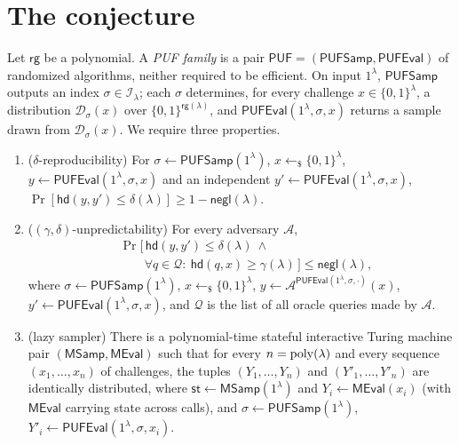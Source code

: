 \documentclass{aicr-conjecture}
\newcommand{\PUF}{\mathsf{PUF}}
\newcommand{\PUFSamp}{\mathsf{PUFSamp}}
\newcommand{\PUFEval}{\mathsf{PUFEval}}
\newcommand{\hdist}{\mathsf{hd}}
\newcommand{\negl}{\mathsf{negl}}
\newcommand{\rge}{\mathsf{rg}}
\newcommand{\tst}{\mathsf{st}}
\newcommand{\usample}{\leftarrow_{\$}}
\begin{document}
\section{The conjecture}\label{sec:conjectures}

\begin{definition}\label{def:puf}
Let $\rge$ be a polynomial. A \emph{PUF family} is a pair
$\PUF=(\PUFSamp,\PUFEval)$ of randomized algorithms, neither required
to be efficient. On input $1^\lambda$, $\PUFSamp$ outputs an index
$\sigma\in\mathcal{I}_\lambda$; each $\sigma$ determines, for every
challenge $x\in\{0,1\}^\lambda$, a distribution $\mathcal{D}_\sigma(x)$
over $\{0,1\}^{\rge(\lambda)}$, and $\PUFEval(1^\lambda,\sigma,x)$
returns a sample drawn from $\mathcal{D}_\sigma(x)$. We require three
properties.
\begin{enumerate}
\item ($\delta$-reproducibility) For
$\sigma\leftarrow\PUFSamp(1^\lambda)$, $x\usample\{0,1\}^\lambda$,
$y\leftarrow\PUFEval(1^\lambda,\sigma,x)$ and an independent
$y'\leftarrow\PUFEval(1^\lambda,\sigma,x)$,
$\Pr[\hdist(y,y')\le\delta(\lambda)]\ge 1-\negl(\lambda)$.
\item ($(\gamma,\delta)$-unpredictability) For every adversary
$\mathcal{A}$,
\[
\begin{aligned}
&\Pr\big[\,\hdist(y,y')\le\delta(\lambda)\ \wedge\\
&\qquad\forall q\in\mathcal{Q}:\ \hdist(q,x)\ge\gamma(\lambda)\,\big]
  \le\negl(\lambda),
\end{aligned}
\]
where $\sigma\leftarrow\PUFSamp(1^\lambda)$,
$x\usample\{0,1\}^\lambda$,
$y\leftarrow\mathcal{A}^{\PUFEval(1^\lambda,\sigma,\cdot)}(x)$,
$y'\leftarrow\PUFEval(1^\lambda,\sigma,x)$, and $\mathcal{Q}$ is the
list of all oracle queries made by $\mathcal{A}$.
\item (lazy sampler) There is a polynomial-time stateful interactive
Turing machine pair $(\mathsf{MSamp},\mathsf{MEval})$ such that for
every $n=\mathrm{poly}(\lambda)$ and every sequence $(x_1,\dots,x_n)$ of
challenges, the tuples $(Y_1,\dots,Y_n)$ and $(Y'_1,\dots,Y'_n)$ are
identically distributed, where
$\tst\leftarrow\mathsf{MSamp}(1^\lambda)$ and
$Y_i\leftarrow\mathsf{MEval}(x_i)$ (with $\mathsf{MEval}$ carrying
state across calls), and $\sigma\leftarrow\PUFSamp(1^\lambda)$,
$Y'_i\leftarrow\PUFEval(1^\lambda,\sigma,x_i)$.
\end{enumerate}
\end{definition}
\end{document}
